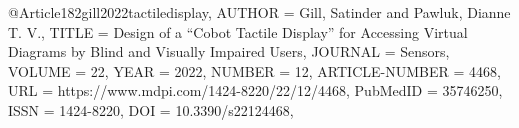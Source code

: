 @Article{182gill2022tactiledisplay,
AUTHOR = {Gill, Satinder and Pawluk, Dianne T. V.},
TITLE = {Design of a “Cobot Tactile Display” for Accessing Virtual Diagrams by Blind and Visually Impaired Users},
JOURNAL = {Sensors},
VOLUME = {22},
YEAR = {2022},
NUMBER = {12},
ARTICLE-NUMBER = {4468},
URL = {https://www.mdpi.com/1424-8220/22/12/4468},
PubMedID = {35746250},
ISSN = {1424-8220},
DOI = {10.3390/s22124468},}